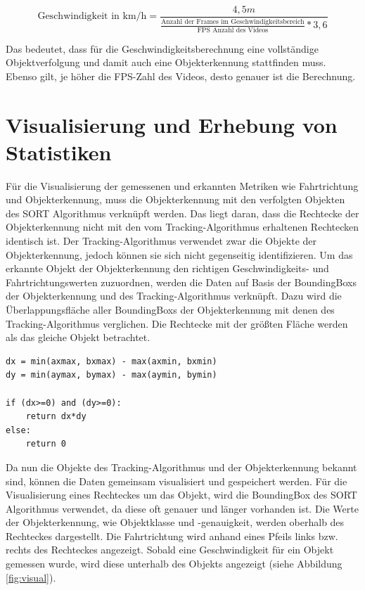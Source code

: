 \begin{equation}
	\text{Geschwindigkeit in km/h} = \frac{4,5m}{\frac{\text{Anzahl der Frames im Geschwindigkeitsbereich}}{\text{FPS Anzahl des Videos}} * 3,6} 
\end{equation}

Das bedeutet, dass für die Geschwindigkeitsberechnung eine vollständige Objektverfolgung und damit auch eine Objekterkennung stattfinden muss. Ebenso gilt, je höher die FPS-Zahl des Videos, desto genauer ist die Berechnung.

\section{Visualisierung und Erhebung von Statistiken}

Für die Visualisierung der gemessenen und erkannten Metriken wie Fahrtrichtung und Objekterkennung, muss die Objekterkennung mit den verfolgten Objekten des \ac{SORT} Algorithmus verknüpft werden. Das liegt daran, dass die Rechtecke der Objekterkennung nicht mit den vom Tracking-Algorithmus erhaltenen Rechtecken identisch ist. Der Tracking-Algorithmus verwendet zwar die Objekte der Objekterkennung, jedoch können sie sich nicht gegenseitig identifizieren. Um das erkannte Objekt der Objekterkennung den richtigen Geschwindigkeits- und Fahrtrichtungswerten zuzuordnen, werden die Daten auf Basis der \glspl{BoundingBox} der Objekterkennung und des Tracking-Algorithmus verknüpft. Dazu wird die Überlappungsfläche aller \glspl{BoundingBox} der Objekterkennung mit denen des Tracking-Algorithmus verglichen. Die Rechtecke mit der größten Fläche werden als das gleiche Objekt betrachtet.

\vspace*{5mm}
\begin{lstlisting}[caption={Berechnung der Fläche zweier Rechtecke a und b}, label={lst:computation_of_area}]
dx = min(axmax, bxmax) - max(axmin, bxmin)
dy = min(aymax, bymax) - max(aymin, bymin)

if (dx>=0) and (dy>=0):
    return dx*dy
else:
    return 0
\end{lstlisting}

Da nun die Objekte des Tracking-Algorithmus und der Objekterkennung bekannt sind, können die Daten gemeinsam visualisiert und gespeichert werden. Für die Visualisierung eines Rechteckes um das Objekt, wird die \gls{BoundingBox} des \ac{SORT} Algorithmus verwendet, da diese oft genauer und länger vorhanden ist. Die Werte der Objekterkennung, wie Objektklasse und -genauigkeit, werden oberhalb des Rechteckes dargestellt. Die Fahrtrichtung wird anhand eines Pfeils links bzw. rechts des Rechteckes angezeigt. Sobald eine Geschwindigkeit für ein Objekt gemessen wurde, wird diese unterhalb des Objekts angezeigt (siehe Abbildung \ref{fig:visual}).

